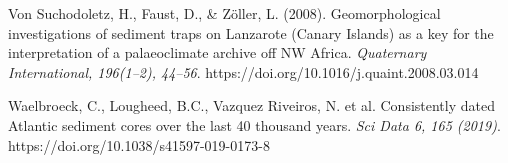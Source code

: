 \documentclass[twocolumn,a4paper,aps,amsmath,amssymb,floatfix,superscriptaddress]{revtex4-2}
\begin{document}
\begin{thebibliography}{99}
		 Von Suchodoletz, H., Faust, D., \& Zöller, L. (2008). Geomorphological investigations of sediment traps on Lanzarote (Canary Islands) as a key for the interpretation of a palaeoclimate archive off NW Africa. \textit{Quaternary International, 196(1–2), 44–56}. https://doi.org/10.1016/j.quaint.2008.03.014
		
		Waelbroeck, C., Lougheed, B.C., Vazquez Riveiros, N. et al. Consistently dated Atlantic sediment cores over the last 40 thousand years. \textit{Sci Data 6, 165 (2019)}. https://doi.org/10.1038/s41597-019-0173-8
	\end{thebibliography}
	
\end{document}
